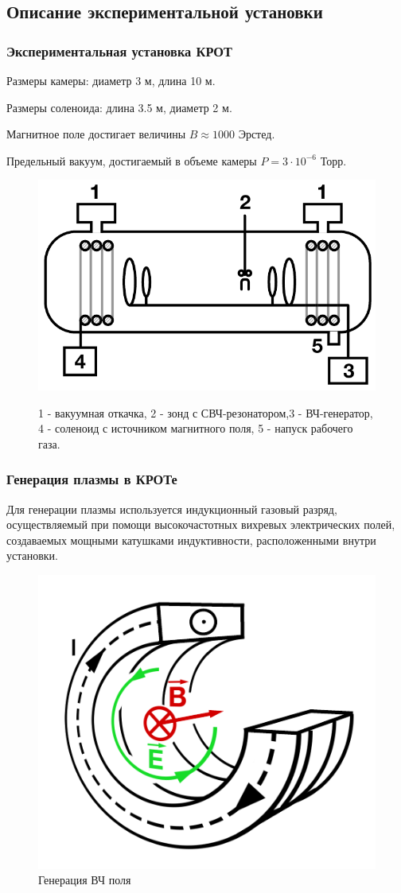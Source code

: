 \documentclass[10pt,pdf,hyperref={unicode}, dvipsnames]{beamer}
\begin{document}
\subsection{Описание экспериментальной установки}
\begin{frame}
	\frametitle{Экспериментальная установка КРОТ}
	Размеры камеры: диаметр 3 м, длина 10 м.

	Размеры соленоида: длина 3.5 м, диаметр 2 м. 
	
	Магнитное поле достигает величины $B\approx 1000$ Эрстед. 
	
	Предельный вакуум, достигаемый в объеме камеры $P =3\cdot10^{-6}$ Торр. 
	\begin{figure}[tb]
		\vspace{0pt}
		\centering
		\includegraphics[width=0.6\linewidth]{fig/krot}
		\label{fig:krot}
		\caption{1 - вакуумная откачка, 2 - зонд с СВЧ-резонатором,3 - ВЧ-генератор, 4 - соленоид с источником магнитного поля, 5 - напуск рабочего газа.}
	\end{figure}
\end{frame}
\begin{frame}
	\frametitle{Генерация плазмы в КРОТе}

		Для генерации плазмы используется индукционный газовый разряд, осуществляемый при помощи высокочастотных вихревых электрических
	полей, создаваемых мощными катушками индуктивности, расположенными внутри установки.
	\begin{figure}[H]
		\begin{minipage}{\linewidth}
				\centering
				\includegraphics[width=0.4\linewidth]{fig/induct}
				\caption{Генерация ВЧ поля}
				\label{fig:resonator}
		\end{minipage}
		\end{figure}
\end{frame}
\end{document}
